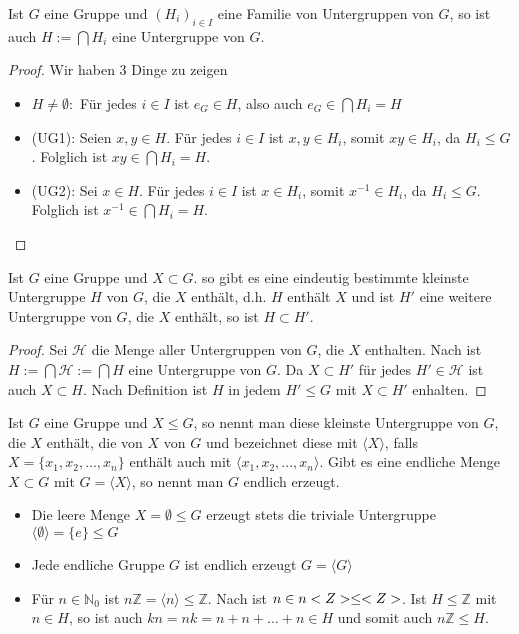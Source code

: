 \begin{lemma}
	Ist $G$ eine Gruppe und $(H_i)_{i \in I}$ eine Familie von Untergruppen von $G$,
	so ist auch $H := \bigcap H_i$ eine Untergruppe von $G$.
\end{lemma}
\begin{proof}
	Wir haben 3 Dinge zu zeigen
	\begin{itemize}
		\item $H \neq \emptyset:$ Für jedes $i \in I$ ist $e_G \in H$, also auch $e_G \in \bigcap
		H_i =H$
		\item (UG1): Seien $x,y \in H$. Für jedes $i \in I$ ist $x,y \in H_i$, somit $xy \in H_i$,
		da $H_i \le G$. Folglich ist $xy \in \bigcap H_i=H$.
		\item (UG2): Sei $x \in H$. Für jedes $i \in I$ ist $x \in H_i$, somit $x^{-1} \in H_i$,
		da $H_i \le G$. Folglich ist $x^{-1} \in \bigcap H_i=H$.
	\end{itemize}
\end{proof}

\begin{proposition}
	Ist $G$ eine Gruppe und $X \subset G$. so gibt es eine eindeutig bestimmte
	kleinste Untergruppe $H$ von $G$, die $X$ enthält, d.h. $H$ enthält $X$ und ist $H'$
	eine weitere Untergruppe von $G$, die $X$ enthält, so ist $H \subset H'$.
\end{proposition}
\begin{proof}
	Sei $\mathcal{H}$ die Menge aller Untergruppen von $G$, die $X$ enthalten. Nach 
	ist $H:=
	\bigcap \mathcal{H} := \bigcap H$ eine Untergruppe von $G$. Da $X \subset H'$ für jedes $H' \in 
	\mathcal H$ ist auch $X \subset H$. Nach Definition ist $H$ in jedem $H' \le G$ mit $X \subset H'$
	enhalten.
\end{proof}

\begin{definition}
	Ist $G$ eine Gruppe und $X \le G$, so nennt man diese
	kleinste Untergruppe von $G$, die $X$ enthält, die von $X$  von $G$ und
	bezeichnet diese mit $\langle X\rangle$, falls $X = \{x_1,x_2,...,x_n\}$ enthält auch mit $\langle x_1,x_2,
	...,x_n\rangle$. Gibt es eine endliche Menge $X \subset G$ mit $G=\langle X\rangle$, so nennt man $G$ endlich
	erzeugt.
\end{definition}

\begin{example}
	\begin{itemize}
		\item Die leere Menge $X=\emptyset \le G$ erzeugt stets die triviale Untergruppe $\langle \emptyset\rangle
		=\{e\} \le G$
		\item Jede endliche Gruppe $G$ ist endlich erzeugt $G=\langle G\rangle$
		\item Für $n \in \mathbb{N}_0$ ist $n\mathbb{Z}=\langle n\rangle \le \mathbb{Z}$. Nach  ist $n\in n<Z>\le<Z>$. Ist $H \le \mathbb{Z}$
		mit $n \in H$, so ist auch $kn=nk=n+n+...+n \in H$ und somit auch $n\mathbb{Z} \le H$.
	\end{itemize}
\end{example}